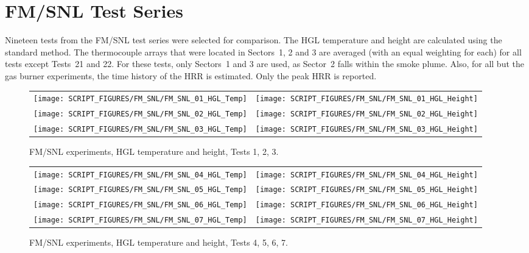 \section{FM/SNL Test Series}

Nineteen tests from the FM/SNL test series were selected for comparison. The HGL temperature and height are calculated using the standard method. The thermocouple arrays that were located in Sectors~1, 2 and 3 are averaged (with an equal weighting for each) for all tests except Tests~21 and 22. For these tests, only Sectors~1 and 3 are used, as Sector~2 falls within the smoke plume. Also, for all but the gas burner experiments, the time history of the HRR is estimated. Only the peak HRR is reported.


\begin{figure}[!h]
\begin{tabular*}{\textwidth}{l@{\extracolsep{\fill}}r}
\texttt{[image: SCRIPT\_FIGURES/FM\_SNL/FM\_SNL\_01\_HGL\_Temp]} &
\texttt{[image: SCRIPT\_FIGURES/FM\_SNL/FM\_SNL\_01\_HGL\_Height]} \\
\texttt{[image: SCRIPT\_FIGURES/FM\_SNL/FM\_SNL\_02\_HGL\_Temp]} &
\texttt{[image: SCRIPT\_FIGURES/FM\_SNL/FM\_SNL\_02\_HGL\_Height]} \\
\texttt{[image: SCRIPT\_FIGURES/FM\_SNL/FM\_SNL\_03\_HGL\_Temp]} &
\texttt{[image: SCRIPT\_FIGURES/FM\_SNL/FM\_SNL\_03\_HGL\_Height]}
\end{tabular*}
\caption[FM/SNL experiments, HGL temperature and height, Tests 1, 2, 3]
{FM/SNL experiments, HGL temperature and height, Tests 1, 2, 3.}
\label{FM_SNL_HGL_1}
\end{figure}

\newpage

\begin{figure}[p]
\begin{tabular*}{\textwidth}{l@{\extracolsep{\fill}}r}
\texttt{[image: SCRIPT\_FIGURES/FM\_SNL/FM\_SNL\_04\_HGL\_Temp]} &
\texttt{[image: SCRIPT\_FIGURES/FM\_SNL/FM\_SNL\_04\_HGL\_Height]} \\
\texttt{[image: SCRIPT\_FIGURES/FM\_SNL/FM\_SNL\_05\_HGL\_Temp]} &
\texttt{[image: SCRIPT\_FIGURES/FM\_SNL/FM\_SNL\_05\_HGL\_Height]} \\
\texttt{[image: SCRIPT\_FIGURES/FM\_SNL/FM\_SNL\_06\_HGL\_Temp]} &
\texttt{[image: SCRIPT\_FIGURES/FM\_SNL/FM\_SNL\_06\_HGL\_Height]} \\
\texttt{[image: SCRIPT\_FIGURES/FM\_SNL/FM\_SNL\_07\_HGL\_Temp]} &
\texttt{[image: SCRIPT\_FIGURES/FM\_SNL/FM\_SNL\_07\_HGL\_Height]}
\end{tabular*}
\caption[FM/SNL experiments, HGL temperature and height, Tests 4, 5, 6, 7]
{FM/SNL experiments, HGL temperature and height, Tests 4, 5, 6, 7.}
\label{FM_SNL_HGL_2}
\end{figure}

